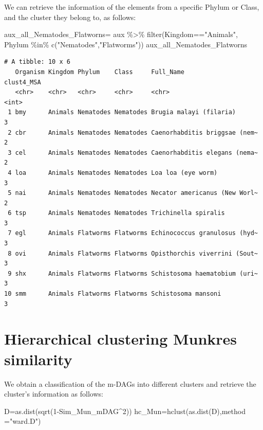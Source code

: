 \documentclass[
  letterpaper,
  DIV=11,
  numbers=noendperiod]{scrreprt}
\newenvironment{Shaded}{}{}
\newcommand{\AttributeTok}[1]{\textcolor[rgb]{0.78,0.47,0.87}{#1}}
\newcommand{\DecValTok}[1]{\textcolor[rgb]{0.82,0.60,0.40}{#1}}
\newcommand{\FunctionTok}[1]{\textcolor[rgb]{0.38,0.69,0.94}{#1}}
\newcommand{\NormalTok}[1]{\textcolor[rgb]{0.67,0.70,0.75}{#1}}
\newcommand{\OtherTok}[1]{\textcolor[rgb]{0.15,0.68,0.38}{#1}}
\newcommand{\SpecialCharTok}[1]{\textcolor[rgb]{0.34,0.71,0.76}{#1}}
\newcommand{\StringTok}[1]{\textcolor[rgb]{0.60,0.76,0.47}{#1}}
\begin{document}
We can retrieve the information of the elements from a specific Phylum
or Class, and the cluster they belong to, as follows:

\begin{Shaded}
\begin{Highlighting}[]
\NormalTok{aux\_all\_Nematodes\_Flatworns}\OtherTok{=}\NormalTok{ aux }\SpecialCharTok{\%\textgreater{}\%} 
  \FunctionTok{filter}\NormalTok{(Kingdom}\SpecialCharTok{==}\StringTok{"Animals"}\NormalTok{,}
\NormalTok{         Phylum }\SpecialCharTok{\%in\%} \FunctionTok{c}\NormalTok{(}\StringTok{"Nematodes"}\NormalTok{,}\StringTok{"Flatworms"}\NormalTok{))}
\NormalTok{aux\_all\_Nematodes\_Flatworns}
\end{Highlighting}
\end{Shaded}

\begin{verbatim}
# A tibble: 10 x 6
   Organism Kingdom Phylum    Class     Full_Name                     clust4_MSA
   <chr>    <chr>   <chr>     <chr>     <chr>                              <int>
 1 bmy      Animals Nematodes Nematodes Brugia malayi (filaria)                3
 2 cbr      Animals Nematodes Nematodes Caenorhabditis briggsae (nem~          2
 3 cel      Animals Nematodes Nematodes Caenorhabditis elegans (nema~          2
 4 loa      Animals Nematodes Nematodes Loa loa (eye worm)                     3
 5 nai      Animals Nematodes Nematodes Necator americanus (New Worl~          2
 6 tsp      Animals Nematodes Nematodes Trichinella spiralis                   3
 7 egl      Animals Flatworms Flatworms Echinococcus granulosus (hyd~          3
 8 ovi      Animals Flatworms Flatworms Opisthorchis viverrini (Sout~          3
 9 shx      Animals Flatworms Flatworms Schistosoma haematobium (uri~          3
10 smm      Animals Flatworms Flatworms Schistosoma mansoni                    3
\end{verbatim}

\hypertarget{hierarchical-clustering-munkres-similarity}{%
\section{Hierarchical clustering Munkres
similarity}\label{hierarchical-clustering-munkres-similarity}}

We obtain a classification of the m-DAGs into different clusters and
retrieve the cluster's information as follows:

\begin{Shaded}
\begin{Highlighting}[]
\NormalTok{D}\OtherTok{=}\FunctionTok{as.dist}\NormalTok{(}\FunctionTok{sqrt}\NormalTok{(}\DecValTok{1}\SpecialCharTok{{-}}\NormalTok{Sim\_Mun\_mDAG}\SpecialCharTok{\^{}}\DecValTok{2}\NormalTok{))}
\NormalTok{hc\_Mun}\OtherTok{=}\FunctionTok{hclust}\NormalTok{(}\FunctionTok{as.dist}\NormalTok{(D),}\AttributeTok{method =}\StringTok{"ward.D"}\NormalTok{)}
\end{Highlighting}
\end{Shaded}
\end{document}
